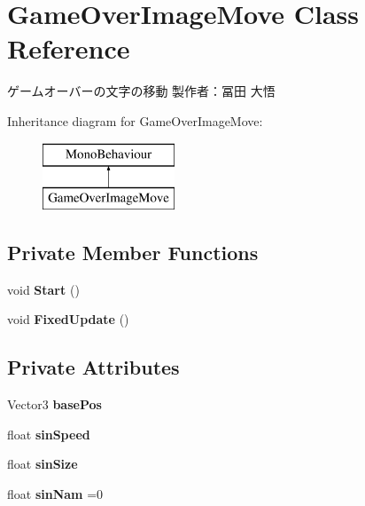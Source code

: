 \hypertarget{class_game_over_image_move}{}\section{Game\+Over\+Image\+Move Class Reference}
\label{class_game_over_image_move}


ゲームオーバーの文字の移動 製作者：冨田 大悟  


Inheritance diagram for Game\+Over\+Image\+Move\+:\begin{figure}[H]
\begin{center}
\leavevmode
\includegraphics[height=2.000000cm]{class_game_over_image_move}
\end{center}
\end{figure}
\subsection*{Private Member Functions}
\begin{DoxyCompactItemize}
\item 
\mbox{\label{class_game_over_image_move_acdcf8d54e8e7462e57bd5f92c807430a}} 
void {\bfseries Start} ()
\item 
\mbox{\label{class_game_over_image_move_a2430ff57fa4ea8598a7802683a13500c}} 
void {\bfseries Fixed\+Update} ()
\end{DoxyCompactItemize}
\subsection*{Private Attributes}
\begin{DoxyCompactItemize}
\item 
\mbox{\label{class_game_over_image_move_afbadfbf051da76669220b348c6212937}} 
Vector3 {\bfseries base\+Pos}
\item 
\mbox{\label{class_game_over_image_move_a4637748f4f7dc4312154ddd4595c5f71}} 
float {\bfseries sin\+Speed}
\item 
\mbox{\label{class_game_over_image_move_a3d68053a2e4c27bb00b29276328443e0}} 
float {\bfseries sin\+Size}
\item 
\mbox{\label{class_game_over_image_move_a32242dbd021a6e8e1d9653fc4a9d4633}} 
float {\bfseries sin\+Nam} =0
\end{DoxyCompactItemize}


